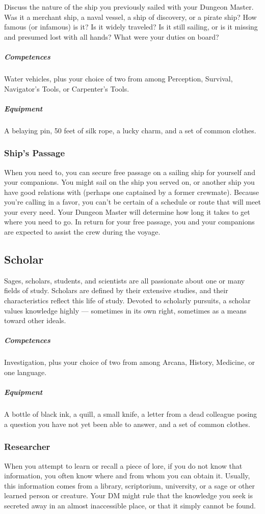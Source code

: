     Discuss the nature of the ship you previously sailed with your Dungeon Master.
    Was it a merchant ship, a naval vessel, a ship of discovery, or a pirate ship?
    How famous (or infamous) is it?
    Is it widely traveled?
    Is it still sailing, or is it missing and presumed lost with all hands?
    What were your duties on board?
    \subparagraph{Competences} Water vehicles, plus your choice of two from among Perception, Survival, Navigator's Tools, or Carpenter's Tools.
    \subparagraph{Equipment} A belaying pin, 50 feet of silk rope, a lucky charm, and a set of common clothes.
    \subsubsection{Ship's Passage}
        When you need to, you can secure free passage on a sailing ship for yourself and your companions.
        You might sail on the ship you served on, or another ship you have good relations with (perhaps one captained by a former crewmate).
        Because you're calling in a favor, you can't be certain of a schedule or route that will meet your every need.
        Your Dungeon Master will determine how long it takes to get where you need to go.
        In return for your free passage, you and your companions are expected to assist the crew during the voyage.

\subsection*{Scholar} \label{ssec::scholar}
    Sages, scholars, students, and scientists are all passionate about one or many fields of study.
    Scholars are defined by their extensive studies, and their characteristics reflect this life of study.
    Devoted to scholarly pursuits, a scholar values knowledge highly --- sometimes in its own right, sometimes as a means toward other ideals.
    \subparagraph{Competences} Investigation, plus your choice of two from among Arcana, History, Medicine, or one language.
    \subparagraph{Equipment} A bottle of black ink, a quill, a small knife, a letter from a dead colleague posing a question you have not yet been able to answer, and a set of common clothes.
    \subsubsection{Researcher} \label{feat::researcher}
        When you attempt to learn or recall a piece of lore, if you do not know that information, you often know where and from whom you can obtain it.
        Usually, this information comes from a library, scriptorium, university, or a sage or other learned person or creature.
        Your DM might rule that the knowledge you seek is secreted away in an almost inaccessible place, or that it simply cannot be found.

